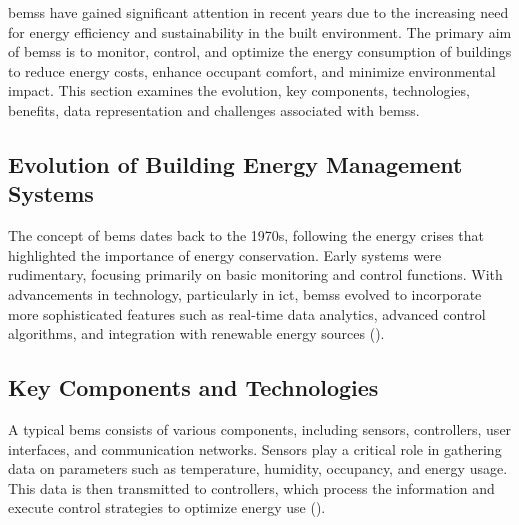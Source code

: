 \glspl{bems} have gained significant attention in recent years due to the increasing need for energy efficiency and sustainability in the built environment.
The primary aim of \glspl{bems} is to monitor, control, and optimize the energy consumption of buildings to reduce energy costs, enhance occupant comfort, and minimize environmental impact.
This section examines the evolution, key components, technologies, benefits, data representation and challenges associated with \glspl{bems}.

\subsection*{Evolution of Building Energy Management Systems}
The concept of \gls{bems} dates back to the 1970s, following the energy crises that highlighted the importance of energy conservation.
Early systems were rudimentary, focusing primarily on basic monitoring and control functions.
With advancements in technology, particularly in \gls{ict}, \glspl{bems} evolved to incorporate more sophisticated features such as real-time data analytics, advanced control algorithms, and integration with renewable energy sources (\cite{Wang2012}).

\subsection*{Key Components and Technologies}
A typical \gls{bems} consists of various components, including sensors, controllers, user interfaces, and communication networks.
Sensors play a critical role in gathering data on parameters such as temperature, humidity, occupancy, and energy usage.
This data is then transmitted to controllers, which process the information and execute control strategies to optimize energy use (\cite{Candanedo2016}).

